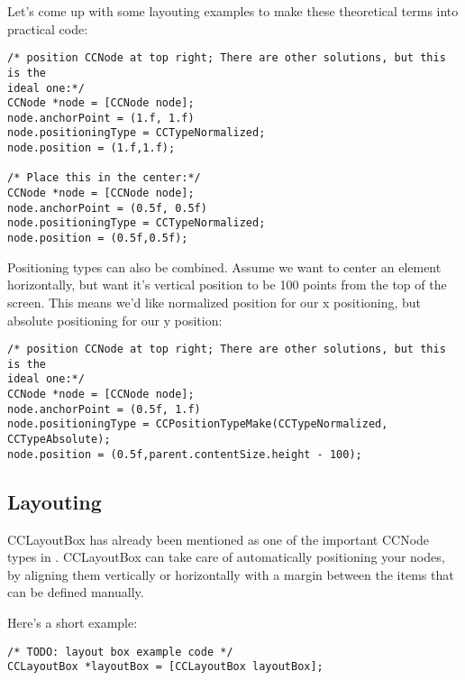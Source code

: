Let's come up with some layouting examples to make these theoretical terms into
practical code:

\begin{lstlisting}
/* position CCNode at top right; There are other solutions, but this is the
ideal one:*/
CCNode *node = [CCNode node];
node.anchorPoint = (1.f, 1.f)
node.positioningType = CCTypeNormalized;
node.position = (1.f,1.f);

/* Place this in the center:*/ 
CCNode *node = [CCNode node];
node.anchorPoint = (0.5f, 0.5f)
node.positioningType = CCTypeNormalized;
node.position = (0.5f,0.5f);
\end{lstlisting}

Positioning types can also be combined. Assume we want to center an element
horizontally, but want it's vertical position to be 100 points from the top of
the screen. This means we'd like normalized position for our x positioning, but
absolute positioning for our y position:

\begin{lstlisting}
/* position CCNode at top right; There are other solutions, but this is the
ideal one:*/
CCNode *node = [CCNode node];
node.anchorPoint = (0.5f, 1.f)
node.positioningType = CCPositionTypeMake(CCTypeNormalized, CCTypeAbsolute);
node.position = (0.5f,parent.contentSize.height - 100);
\end{lstlisting}
 
\subsection{Layouting}
CCLayoutBox has already been mentioned as one of the important CCNode types in
\cocos{}. CCLayoutBox can take care of automatically positioning your nodes, by
aligning them vertically or horizontally with a margin between the items that
can be defined manually.

Here's a short example:
\begin{lstlisting}
/* TODO: layout box example code */
CCLayoutBox *layoutBox = [CCLayoutBox layoutBox];
\end{lstlisting}
 
